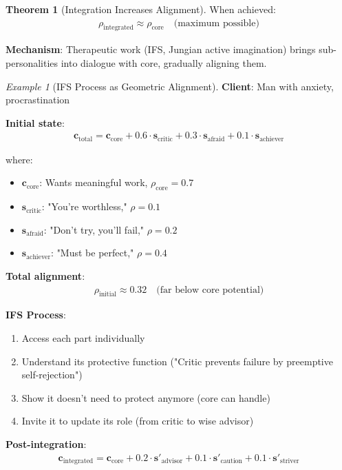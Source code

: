 \documentclass[11pt,a4paper]{article}
\theoremstyle{definition}
\newtheorem{theorem}{Theorem}[section]
\theoremstyle{remark}
\newtheorem{example}{Example}[section]
\newcommand{\cc}{\mathbf{c}}
\begin{document}
\begin{small}
\begin{enumerate}
\begin{theorem}[Integration Increases Alignment]
When achieved:
\begin{align}
\rho_{\text{integrated}} \approx \rho_{\text{core}} \quad \text{(maximum possible)}
\end{align}

\textbf{Mechanism}: Therapeutic work (IFS, Jungian active imagination) brings sub-personalities into dialogue with core, gradually aligning them.
\end{theorem}

\begin{example}[IFS Process as Geometric Alignment]
\textbf{Client}: Man with anxiety, procrastination

\textbf{Initial state}:
\begin{align}
\cc_{\text{total}} = \cc_{\text{core}} + 0.6 \cdot \mathbf{s}_{\text{critic}} + 0.3 \cdot \mathbf{s}_{\text{afraid}} + 0.1 \cdot \mathbf{s}_{\text{achiever}}
\end{align}

where:
\begin{itemize}
    \item \(\cc_{\text{core}}\): Wants meaningful work, \(\rho_{\text{core}} = 0.7\)
    \item \(\mathbf{s}_{\text{critic}}\): "You're worthless," \(\rho = 0.1\)
    \item \(\mathbf{s}_{\text{afraid}}\): "Don't try, you'll fail," \(\rho = 0.2\)
    \item \(\mathbf{s}_{\text{achiever}}\): "Must be perfect," \(\rho = 0.4\)
\end{itemize}

\textbf{Total alignment}:
\begin{align}
\rho_{\text{initial}} \approx 0.32 \quad \text{(far below core potential)}
\end{align}

\textbf{IFS Process}:
\begin{enumerate}
    \item Access each part individually
    \item Understand its protective function ("Critic prevents failure by preemptive self-rejection")
    \item Show it doesn't need to protect anymore (core can handle)
    \item Invite it to update its role (from critic to wise advisor)
\end{enumerate}

\textbf{Post-integration}:
\begin{align}
\cc_{\text{integrated}} = \cc_{\text{core}} + 0.2 \cdot \mathbf{s}'_{\text{advisor}} + 0.1 \cdot \mathbf{s}'_{\text{caution}} + 0.1 \cdot \mathbf{s}'_{\text{striver}}
\end{align}


\end{example}
\end{enumerate}
\end{small}
\end{document}
